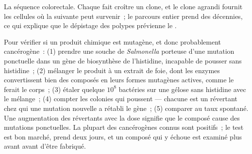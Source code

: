 \begin{omfigure}

{\small La séquence colorectale. Chaque  fait croître un
clone, et le clone agrandi fournit les cellules où la 
suivante peut survenir~; le parcours entier prend des décennies, ce qui
explique que le dépistage des polypes prévienne le .}
\end{omfigure}

\begin{method}\label{met:b3:cancer-biology:ames}
Pour vérifier si un produit chimique est mutagène, et donc
probablement cancérogène~: (1) prendre une souche de \emph{Salmonella}
porteuse d'une mutation ponctuelle dans un gène de biosynthèse de
l'histidine, incapable de pousser sans histidine~; (2) mélanger le
produit à un extrait de foie, dont les enzymes convertissent bien des
composés en leurs formes mutagènes actives, comme le ferait le corps~;
(3) étaler quelque $10^{8}$ bactéries sur une gélose sans histidine
avec le mélange~; (4) compter les colonies qui poussent --- chacune est
un révertant chez qui une mutation nouvelle a rétabli le gène~;
(5) comparer au taux spontané. Une augmentation des révertants avec la
dose signifie que le composé cause des mutations ponctuelles. La
plupart des cancérogènes connus sont positifs~; le test est bon marché,
prend deux jours, et un composé qui y échoue est examiné plus avant
avant d'être fabriqué.
\end{method}

